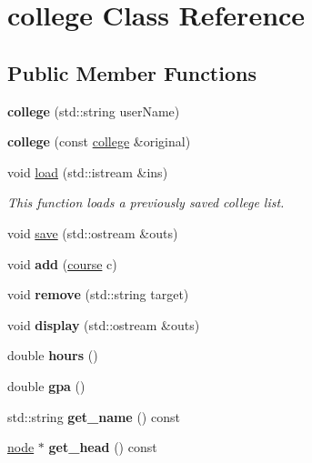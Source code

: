 \hypertarget{classcollege}{}\section{college Class Reference}
\label{classcollege}
\subsection*{Public Member Functions}
\begin{DoxyCompactItemize}
\item 
\mbox{\label{classcollege_a9947f16a7d155ccbf8e1659dea2902a8}} 
{\bfseries college} (std\+::string user\+Name)
\item 
\mbox{\label{classcollege_a9718e2693a7695939224afbba1022814}} 
{\bfseries college} (const \hyperlink{classcollege}{college} \&original)
\item 
\mbox{\label{classcollege_ab27de382f28a46e2bd3d82903843d4d9}} 
void \hyperlink{classcollege_ab27de382f28a46e2bd3d82903843d4d9}{load} (std\+::istream \&ins)
\begin{DoxyCompactList}\small\item\em This function loads a previously saved college list. \end{DoxyCompactList}\item 
void \hyperlink{classcollege_ae86e11e6643736a60b6df911820c6510}{save} (std\+::ostream \&outs)
\item 
\mbox{\label{classcollege_a6ea53cd23d176014dad982f8141b5697}} 
void {\bfseries add} (\hyperlink{classcourse}{course} c)
\item 
\mbox{\label{classcollege_a59bd86c2e484588bb82bded4de0c77fc}} 
void {\bfseries remove} (std\+::string target)
\item 
\mbox{\label{classcollege_aae2ecf83fff1508e3e687de83cf5603a}} 
void {\bfseries display} (std\+::ostream \&outs)
\item 
\mbox{\label{classcollege_a5b58237ab41c99ce4f93593b9069a5fb}} 
double {\bfseries hours} ()
\item 
\mbox{\label{classcollege_a92ecdc9fc7b2d3388711164db62e19d1}} 
double {\bfseries gpa} ()
\item 
\mbox{\label{classcollege_a0dfbed37e1b0687fe09dd19bf66debdc}} 
std\+::string {\bfseries get\+\_\+name} () const
\item 
\mbox{\label{classcollege_a2bb49e5430c39577b74d36252aeeebc2}} 
\hyperlink{classnode}{node} $\ast$ {\bfseries get\+\_\+head} () const
\end{DoxyCompactItemize}


